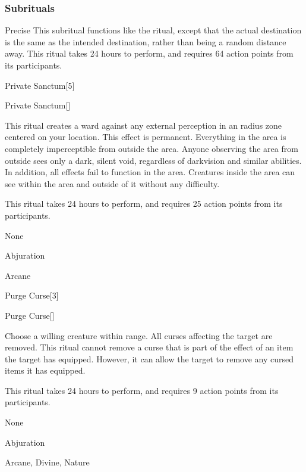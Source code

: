 \subsubsection{Subrituals}


\begin{ability}[\nth{8}]{Precise}
This subritual functions like the  ritual, except that the actual destination is the same as the intended destination, rather than being a random distance away.
This ritual takes 24 hours to perform, and requires 64 action points from its participants.
\end{ability}
\vspace{0.25em}


\begin{spellsection}{Private Sanctum}[5]


\begin{ability}{Private Sanctum}[]

This ritual creates a ward against any external perception in an \arealarge radius zone centered on your location.
This effect is permanent.
Everything in the area is completely imperceptible from outside the area.
Anyone observing the area from outside sees only a dark, silent void, regardless of darkvision and similar abilities.
In addition, all  effects fail to function in the area.
Creatures inside the area can see within the area and outside of it without any difficulty.

This ritual takes 24 hours to perform, and requires 25 action points from its participants.

\end{ability}


 None

 Abjuration

 Arcane
\end{spellsection}


\begin{spellsection}{Purge Curse}[3]


\begin{ability}{Purge Curse}[]

Choose a willing creature within \rngclose range.
All curses affecting the target are removed.
This ritual cannot remove a curse that is part of the effect of an item the target has equipped.
However, it can allow the target to remove any cursed items it has equipped.

This ritual takes 24 hours to perform, and requires 9 action points from its participants.

\end{ability}


 None

 Abjuration

 Arcane, Divine, Nature
\end{spellsection}



